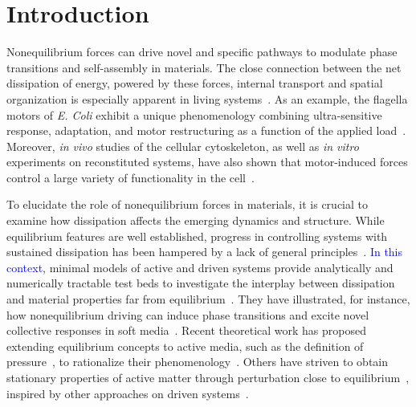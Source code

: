 \documentclass[superscriptaddress, twocolumn, prx, longbibliography, nofootinbib]{revtex4-1}
\begin{document}
\maketitle 




\section{Introduction}

Nonequilibrium forces can drive novel and specific pathways to modulate phase transitions and self-assembly in materials. The close connection between the net dissipation of energy, powered by these forces, internal transport and spatial organization is especially apparent in living systems~\cite{Toyabe2010, Ahmed2016, Battle604, Mura2018}. As an example, the flagella motors of {\it E. Coli} exhibit a unique phenomenology combining ultra-sensitive response, adaptation, and motor restructuring as a function of the applied load~\cite{Lele2013, Lan2012, Wang2017}. Moreover, {\it in vivo} studies of the cellular cytoskeleton, as well as {\it in vitro} experiments on reconstituted systems, have also shown that motor-induced forces control a large variety of functionality in the cell~\cite{Silva2011, Sanchez2012, Blanchoin2014, Murrell2015, Decamp2015}.


To elucidate the role of nonequilibrium forces in materials, it is crucial to examine how dissipation affects the emerging dynamics and structure. 
While equilibrium features are well established, progress in controlling systems with sustained dissipation has been hampered by a lack of general principles~\cite{Cates2015, Solon2015a, Nguyen2016, Fodor2016, Murugan2017, Nardini2017, Nguyen2018}. \textcolor{blue}{In this context}, minimal models of active and driven systems provide analytically and numerically tractable test beds to investigate the interplay between dissipation and material properties far from equilibrium~\cite{Marchetti2013, Han2016, Bechinger2016, delJunco2018, Marchetti2018}. They have illustrated, for instance, how nonequilibrium driving can induce phase transitions and excite novel collective responses in soft media~\cite{Vicsek1995, Tailleur2008, Han2016, Nguyen2016, VanZuiden2016}. Recent theoretical work has proposed extending equilibrium concepts to active media, such as the definition of pressure~\cite{Takatori2015, Solon2015a}, to rationalize their phenomenology~\cite{Solon2018, Solon2018b}. Others have striven to obtain stationary properties of active matter through perturbation close to equilibrium~\cite{Farage2015, Nardini2017, Brader2017}, inspired by other approaches on driven systems~\cite{McLennan1959, Komatsu2008, Maes2009, Maes2010}.
\end{document}

